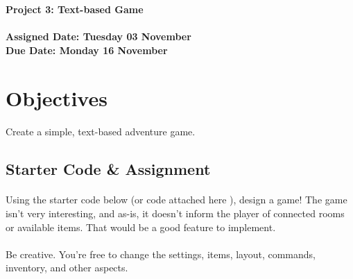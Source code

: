 \documentclass[letter,10pt]{article}
\begin{document}
    
    \huge
    \textbf{Project 3: Text-based Game}
    \normalsize
    \\ ~~ \\
    \textbf{Assigned Date: Tuesday 03 November} \\
    \textbf{Due Date: Monday 16 November}
    
    \section*{Objectives}
    \paragraph{}Create a simple, text-based adventure game.
    
    \subsection*{Starter Code \& Assignment}
    \paragraph{}Using the starter code below (or code attached here ), design a game! The game isn't very interesting, and as-is, it doesn't inform the player of connected rooms or available items. That would be a good feature to implement.
    
    \paragraph{}Be creative. You're free to change the settings, items, layout, commands, inventory, and other aspects.
    
\end{document}
